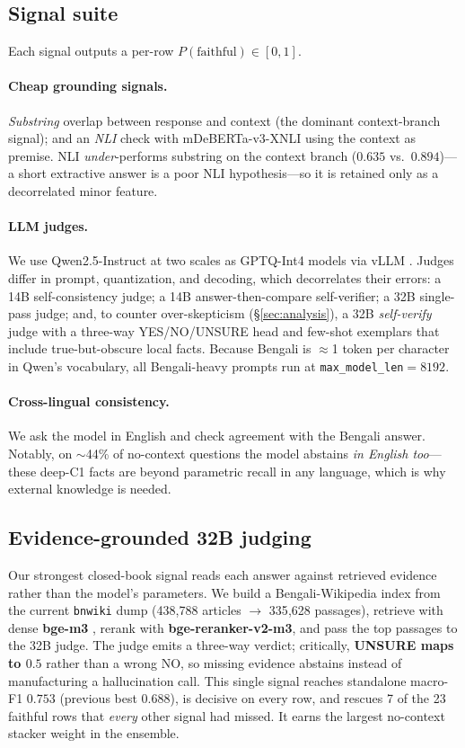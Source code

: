 \documentclass[11pt]{article}
\begin{document}
\subsection{Signal suite}
Each signal outputs a per-row $P(\text{faithful})\in[0,1]$.

\paragraph{Cheap grounding signals.} \emph{Substring} overlap between response
and context (the dominant context-branch signal); and an \emph{NLI} check with
mDeBERTa-v3-XNLI \citep{he2021deberta,laurer2024nli} using the context as
premise. NLI \emph{under}-performs substring on the context branch
($0.635$ vs.\ $0.894$)---a short extractive answer is a poor NLI hypothesis---so
it is retained only as a decorrelated minor feature.

\paragraph{LLM judges.} We use Qwen2.5-Instruct \citep{qwen2024} at two scales
as GPTQ-Int4 models via vLLM \citep{kwon2023vllm,frantar2023gptq}. Judges differ
in prompt, quantization, and decoding, which decorrelates their errors: a
14B self-consistency judge; a 14B answer-then-compare self-verifier; a 32B
single-pass judge; and, to counter over-skepticism (\S\ref{sec:analysis}), a
32B \emph{self-verify} judge with a three-way YES/NO/UNSURE head and few-shot
exemplars that include true-but-obscure local facts. Because Bengali is
$\approx$1 token per character in Qwen's vocabulary, all Bengali-heavy prompts
run at \texttt{max\_model\_len}$=8192$.

\paragraph{Cross-lingual consistency.} We ask the model in English and check
agreement with the Bengali answer. Notably, on $\sim$44\% of no-context
questions the model abstains \emph{in English too}---these deep-C1 facts are
beyond parametric recall in any language, which is why external knowledge is
needed.

\subsection{Evidence-grounded 32B judging}
\label{sec:ret32}
Our strongest closed-book signal reads each answer against retrieved evidence
rather than the model's parameters. We build a Bengali-Wikipedia index from the
current \texttt{bnwiki} dump (438{,}788 articles $\rightarrow$ 335{,}628
passages), retrieve with dense \textbf{bge-m3} \citep{chen2024bgem3}, rerank
with \textbf{bge-reranker-v2-m3}, and pass the top passages to the 32B judge.
The judge emits a three-way verdict; critically, \textbf{UNSURE maps to $0.5$}
rather than a wrong NO, so missing evidence abstains instead of manufacturing a
hallucination call. This single signal reaches standalone macro-F1 $0.753$
(previous best $0.688$), is decisive on every row, and rescues 7 of the 23
faithful rows that \emph{every} other signal had missed. It earns the largest
no-context stacker weight in the ensemble.
\end{document}
